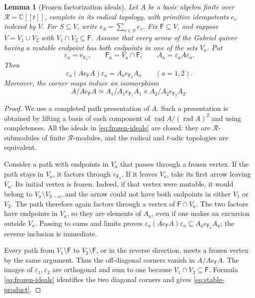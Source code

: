 \documentclass[11pt]{amsart}
\numberwithin{equation}{section}
\newtheorem{lemma}[theorem]{Lemma}
\theoremstyle{definition}
\theoremstyle{remark}
\newcommand{\op}[1]{\operatorname{#1}}
\begin{document}
\begin{lemma}[Frozen factorization ideals]\label{lem:frozen-ideals}
Let $A$ be a basic algebra finite over $\mathcal R=\mathbb C[[t]]$,
complete in its radical topology, with primitive idempotents $e_v$
indexed by $V$. For $S\subseteq V$, write $e_S=\sum_{v\in S}e_v$.
Fix $\mathsf F\subseteq V$, and suppose
$V=V_1\cup V_2$ with $V_1\cap V_2\subseteq\mathsf F$.
Assume that every arrow of the Gabriel quiver having a mutable endpoint
has both endpoints in one of the sets $V_a$. Put
\[ \varepsilon_a=e_{V_a},\qquad \mathsf F_a=V_a\cap\mathsf F,\qquad A_a=\varepsilon_a A\varepsilon_a. \]
Then
\begin{equation}\label{eq:frozen-ideals} \varepsilon_a(Ae_{\mathsf F}A)\varepsilon_a=A_a e_{\mathsf F_a}A_a\qquad(a=1,2).\end{equation}
Moreover, the corner maps induce an isomorphism
\begin{equation}\label{eq:stable-product} A/Ae_{\mathsf F}A\simeq A_1/A_1e_{\mathsf F_1}A_1\times A_2/A_2e_{\mathsf F_2}A_2.\end{equation}
\end{lemma}

\begin{proof}
We use a completed path presentation of $A$. Such a presentation is
obtained by lifting a basis of each component of
$\op{rad}A/(\op{rad}A)^2$ and using completeness.
All the ideals in \eqref{eq:frozen-ideals} are closed: they are
$\mathcal R$-submodules of finite $\mathcal R$-modules, and the
radical and $t$-adic topologies are equivalent.

Consider a path with endpoints in $V_a$ that passes through a frozen
vertex. If the path stays in $V_a$, it factors through $e_{\mathsf F_a}$.
If it leaves $V_a$, take its first arrow leaving $V_a$.
Its initial vertex is frozen. Indeed, if that vertex were mutable,
it would belong to $V_a\setminus V_{3-a}$, and the arrow could not
have both endpoints in either $V_1$ or $V_2$.
The path therefore again factors through a vertex of $\mathsf F\cap V_a$.
The two factors have endpoints in $V_a$, so they are elements of
$A_a$, even if one makes an excursion outside $V_a$.
Passing to sums and limits proves
$\varepsilon_a(Ae_{\mathsf F}A)\varepsilon_a\subseteq A_a e_{\mathsf F_a}A_a$; the reverse inclusion is immediate.

Every path from $V_1\setminus\mathsf F$ to $V_2\setminus\mathsf F$, or in
the reverse direction, meets a frozen vertex by the same argument.
Thus the off-diagonal corners vanish in $A/Ae_{\mathsf F}A$. The images of
$\varepsilon_1,\varepsilon_2$ are orthogonal and sum to one because
$V_1\cap V_2\subseteq\mathsf F$. Formula \eqref{eq:frozen-ideals} identifies the two diagonal
corners and gives \eqref{eq:stable-product}.
\end{proof}
\end{document}
